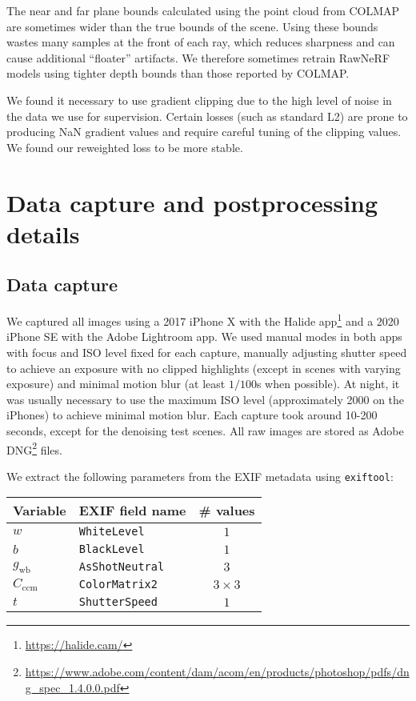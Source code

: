 The near and far plane bounds calculated using the point cloud from COLMAP are sometimes wider than the true bounds of the scene. Using these bounds wastes many samples at the front of each ray, which reduces sharpness and can cause additional ``floater'' artifacts. We therefore sometimes retrain RawNeRF models using tighter depth bounds than those reported by COLMAP.


We found it necessary to use gradient clipping due to the high level of noise in the data we use for supervision. Certain losses (such as standard L2) are prone to producing NaN gradient values and require careful tuning of the clipping values. We found our reweighted loss to be more stable.


\section{Data capture and postprocessing details}


\subsection{Data capture}



We captured all images using a 2017 iPhone X with the Halide app\footnote{\url{https://halide.cam/}} and a 2020 iPhone SE with the Adobe Lightroom app. We used manual modes in both apps with focus and ISO level fixed for each capture, manually adjusting shutter speed to achieve an exposure with no clipped highlights (except in scenes with varying exposure) and minimal motion blur (at least $1/100$s when possible). At night, it was usually necessary to use the maximum ISO level (approximately 2000 on the iPhones) to achieve minimal motion blur. Each capture took around 10-200 seconds, except for the denoising test scenes. All raw images are stored as Adobe DNG\footnote{\url{https://www.adobe.com/content/dam/acom/en/products/photoshop/pdfs/dng_spec_1.4.0.0.pdf}} files.

We extract the following parameters from the EXIF metadata using \texttt{exiftool}:

\begin{table}[h]
    \centering
    \begin{tabular}{llc}
        Variable & EXIF field name & \# values \\ \hline
        $w$& \texttt{WhiteLevel} & $1$ \\
        $b$& \texttt{BlackLevel} & $1$ \\
        $g_\mathrm{wb}$& \texttt{AsShotNeutral}  & $3$ \\
        $C_\mathrm{ccm}$ & \texttt{ColorMatrix2} & $3\times 3$ \\
        $t$ &  \texttt{ShutterSpeed} & $1$  \\
    \end{tabular}
    \label{tab:exif}
\end{table}

